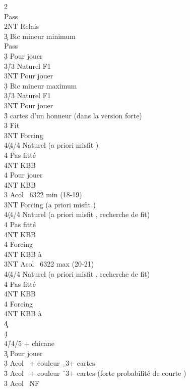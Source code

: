 \documentclass[a4paper]{article}
\begin{document}
\begin{bidtable}
2\s\+\\
Pass\\
2NT \> Relais\+\\
3\c \> Bic mineur minimum\+\\
Pass\\
3\d \> Pour jouer\\
3\h/3\s \> Naturel F1\\
3NT \> Pour jouer\-\\
3\d \> Bic mineur maximum\+\\
3\h/3\s \> Naturel F1\\
3NT \> Pour jouer\-\\
3\h {} cartes d'un honneur (dans la version forte)\+\\
3\s \> Fit \s \\
3NT \> Forcing\\
4\c/4\d/4\h \> Naturel (a priori misfit \s )\+\\
4\s \> Pas fitté\\
4NT \> KBB\-\\
4\s \> Pour jouer\\
4NT \> KBB\-\\
3\s \> Acol \s\ 6322 min (18-19)\+\\
3NT \> Forcing (a priori misfit \s )\\
4\c/4\d/4\h \> Naturel (a priori misfit \s , recherche de fit)\+\\
4\s \> Pas fitté\\
4NT \> KBB\-\\
4\s \> Forcing\\
4NT \> KBB à \s \-\\
3NT \> Acol \s\ 6322 max (20-21)\+\\
4\c/4\d/4\h \> Naturel (a priori misfit \s , recherche de fit)\+\\
4\s \> Pas fitté\\
4NT \> KBB\-\\
4\s \> Forcing\\
4NT \> KBB à \s \-\\
4\c {}\\
4\d {}\\
4\h/4\s {}/5 + chicane\-\\
3\c \> Pour jouer\+\\
3\d \> Acol \s\ + couleur \d\ 3+ cartes\\
3\h \> Acol \s\ + couleur \h\ 3+ cartes (forte probabilité de courte \s )\\
3\s \> Acol \s\ NF\\

\end{bidtable}
\end{document}
